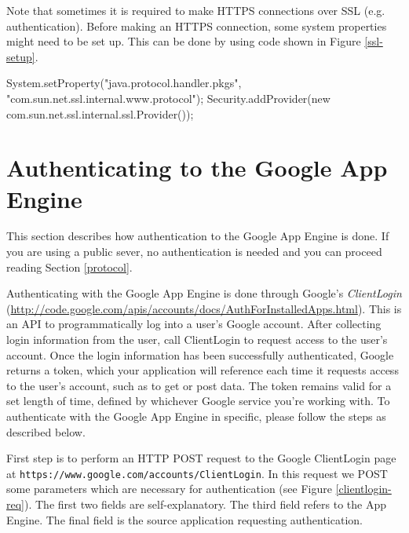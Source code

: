 \documentclass[a4paper,10pt]{article}
\begin{document}
Note that sometimes it is required to make HTTPS connections over SSL
(e.g. authentication). Before making an HTTPS connection, some system
properties might need to be set up. This can be done by using code shown in
Figure \ref{ssl-setup}.

\begin{figure*}[ht] %
\begin{center}
\begin{code}
System.setProperty("java.protocol.handler.pkgs",
                        "com.sun.net.ssl.internal.www.protocol");
Security.addProvider(new com.sun.net.ssl.internal.ssl.Provider());
\end{code}
\caption{Setting up SSL.\label{ssl-setup}}
\end{center}
\end{figure*}

\section{Authenticating to the Google App Engine}
\label{auth}
This section describes how authentication to the Google App Engine is done. If
you are using a public sever, no authentication is needed and you can proceed
reading Section \ref{protocol}.

Authenticating with the Google App Engine is done through Google's
\emph{ClientLogin}
(\url{http://code.google.com/apis/accounts/docs/AuthForInstalledApps.html}).
This is an API to programmatically log into a user's Google account. After
collecting login information from the user, call ClientLogin to request access
to
the user's account. Once the login information has been successfully
authenticated, Google returns a token, which your application will reference
each
time it requests access to the user's account, such as to get or post data. The
token remains valid for a set length of time, defined by whichever Google
service
you're working with. To authenticate with the Google App Engine in specific,
please follow the steps as described below.

First step is to perform an HTTP POST request to the Google ClientLogin page at
\texttt{https://www.google.com/accounts/ClientLogin}. In this request we POST
some parameters which are necessary for authentication (see Figure
\ref{clientlogin-req}). The first two fields are self-explanatory. The third
field refers to the App Engine. The final field is the source application
requesting authentication.
\end{document}
